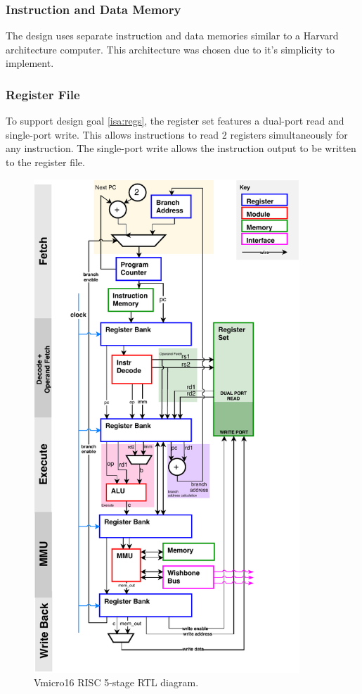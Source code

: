 \documentclass[11pt,a4paper]{report}
\begin{document}
{\subsubsection{Instruction and Data Memory}
The design uses separate instruction and data memories similar to a Harvard architecture computer. This architecture was chosen due to it's simplicity to implement.

\subsubsection{Register File}
To support design goal \ref{isa:regs}, the register set features a dual-port read and single-port write. This allows instructions to read 2 registers simultaneously for any instruction. The single-port write allows the instruction output to be written to the register file. 

\begin{figure}[H]
\centering 
\includegraphics[width=10cm]{../img/risc}
\caption{Vmicro16 RISC 5-stage RTL diagram.}
\label{fig:risc}
\end{figure}

}
\end{document}
